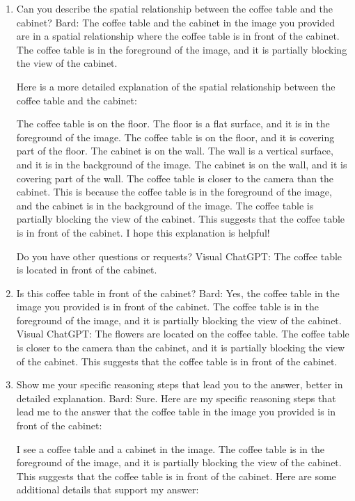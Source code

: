 \begin{enumerate}
    \item Can you describe the spatial relationship between the coffee table and the cabinet?
    \subitem Bard: 
    The coffee table and the cabinet in the image you provided are in a spatial relationship where the coffee table is in front of the cabinet. The coffee table is in the foreground of the image, and it is partially blocking the view of the cabinet.

    Here is a more detailed explanation of the spatial relationship between the coffee table and the cabinet:

    The coffee table is on the floor. The floor is a flat surface, and it is in the foreground of the image. The coffee table is on the floor, and it is covering part of the floor.
    The cabinet is on the wall. The wall is a vertical surface, and it is in the background of the image. The cabinet is on the wall, and it is covering part of the wall.
    The coffee table is closer to the camera than the cabinet. This is because the coffee table is in the foreground of the image, and the cabinet is in the background of the image.
    The coffee table is partially blocking the view of the cabinet. This suggests that the coffee table is in front of the cabinet.
    I hope this explanation is helpful!

    Do you have other questions or requests?
    \subitem Visual ChatGPT: The coffee table is located in front of the cabinet.
    \item Is this coffee table in front of the cabinet?
    \subitem Bard: 
    Yes, the coffee table in the image you provided is in front of the cabinet. The coffee table is in the foreground of the image, and it is partially blocking the view of the cabinet.
    \subitem Visual ChatGPT: The flowers are located on the coffee table. The coffee table is closer to the camera than the cabinet, and it is partially blocking the view of the cabinet. This suggests that the coffee table is in front of the cabinet.
    \item Show me your specific reasoning steps that lead you to the answer, better in detailed explanation.
    \subitem Bard: Sure. Here are my specific reasoning steps that lead me to the answer that the coffee table in the image you provided is in front of the cabinet:

    I see a coffee table and a cabinet in the image.
    The coffee table is in the foreground of the image, and it is partially blocking the view of the cabinet.
    This suggests that the coffee table is in front of the cabinet.
    Here are some additional details that support my answer:
    

\end{enumerate}
